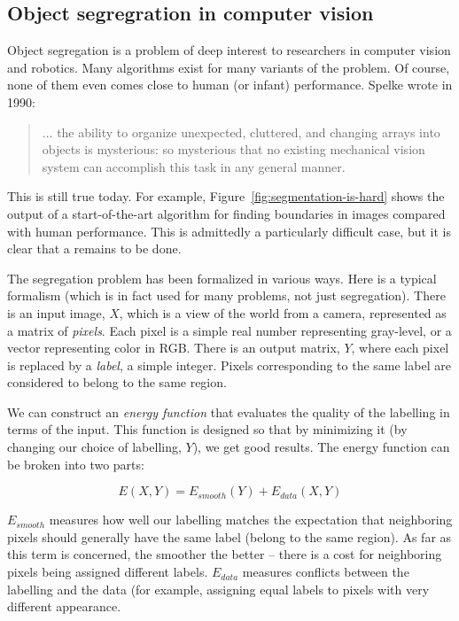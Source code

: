 \subsection{Object segregration in computer vision}

Object segregation is a problem of deep interest to researchers in
computer vision and robotics.  Many algorithms exist for many variants
of the problem.  
Of course, none of them even comes close to human (or
infant) performance.  
Spelke wrote in 1990:

\begin{quote}

... the ability to organize unexpected, cluttered, and
changing arrays into objects is mysterious: so mysterious
that no existing mechanical vision system can accomplish this task
in any general manner.
\cite{spelke90principles}

\end{quote}

\noindent
This is still true today.
For example, Figure~\ref{fig:segmentation-is-hard} shows the
output of a start-of-the-art algorithm for finding boundaries in images
\cite{martin04learning} compared with human performance.  This is
admittedly a particularly difficult case, but it is clear that 
a remains to
be done.


The segregation problem has been formalized in various ways.  Here is
a typical formalism (which is in fact used for many problems, not just
segregation).  There is an input image, $X$, which is a view of the
world from a camera, represented as a matrix of {\em pixels}.  Each
pixel is a simple real number representing gray-level, or a vector
representing color in RGB.
%
There is an output matrix, $Y$, where each pixel is replaced by
a {\em label}, a simple integer.  Pixels corresponding to the 
same label are considered to belong to the same region.

We can construct an {\em energy function} that evaluates the quality
of the labelling in terms of the input.  This function is designed so
that by minimizing it (by changing our choice of labelling, $Y$), we
get good results.  The energy function can be broken into two
parts:

\begin{displaymath}
%
E(X,Y) = E_{smooth}(Y) + E_{data}(X,Y)
%
\end{displaymath}

$E_{smooth}$ measures how well our labelling matches the
expectation that neighboring pixels should generally have the
same label (belong to the same region).
As far as this term is concerned, the smoother the better -- there is
a cost for neighboring pixels being assigned different labels.
$E_{data}$ measures conflicts between the labelling and the data (for
example, assigning equal labels to pixels with very different
appearance.

